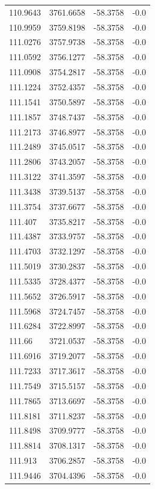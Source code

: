 \begin{table}[H]
\begin{tabular}{llll}
110.9643 & 3761.6658 & -58.3758 & -0.0 \\
110.9959 & 3759.8198 & -58.3758 & -0.0 \\
111.0276 & 3757.9738 & -58.3758 & -0.0 \\
111.0592 & 3756.1277 & -58.3758 & -0.0 \\
111.0908 & 3754.2817 & -58.3758 & -0.0 \\
111.1224 & 3752.4357 & -58.3758 & -0.0 \\
111.1541 & 3750.5897 & -58.3758 & -0.0 \\
111.1857 & 3748.7437 & -58.3758 & -0.0 \\
111.2173 & 3746.8977 & -58.3758 & -0.0 \\
111.2489 & 3745.0517 & -58.3758 & -0.0 \\
111.2806 & 3743.2057 & -58.3758 & -0.0 \\
111.3122 & 3741.3597 & -58.3758 & -0.0 \\
111.3438 & 3739.5137 & -58.3758 & -0.0 \\
111.3754 & 3737.6677 & -58.3758 & -0.0 \\
111.407 & 3735.8217 & -58.3758 & -0.0 \\
111.4387 & 3733.9757 & -58.3758 & -0.0 \\
111.4703 & 3732.1297 & -58.3758 & -0.0 \\
111.5019 & 3730.2837 & -58.3758 & -0.0 \\
111.5335 & 3728.4377 & -58.3758 & -0.0 \\
111.5652 & 3726.5917 & -58.3758 & -0.0 \\
111.5968 & 3724.7457 & -58.3758 & -0.0 \\
111.6284 & 3722.8997 & -58.3758 & -0.0 \\
111.66 & 3721.0537 & -58.3758 & -0.0 \\
111.6916 & 3719.2077 & -58.3758 & -0.0 \\
111.7233 & 3717.3617 & -58.3758 & -0.0 \\
111.7549 & 3715.5157 & -58.3758 & -0.0 \\
111.7865 & 3713.6697 & -58.3758 & -0.0 \\
111.8181 & 3711.8237 & -58.3758 & -0.0 \\
111.8498 & 3709.9777 & -58.3758 & -0.0 \\
111.8814 & 3708.1317 & -58.3758 & -0.0 \\
111.913 & 3706.2857 & -58.3758 & -0.0 \\
111.9446 & 3704.4396 & -58.3758 & -0.0 \\

\end{tabular}
\end{table}
